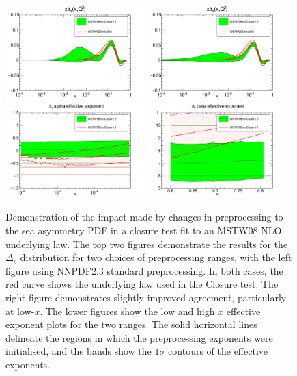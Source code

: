 \begin{figure}[hp!]
\centering
\includegraphics[width=0.48\textwidth]{7-PostLHC/figs/Preproc1/pdf_xDs_log_others.pdf}
\includegraphics[width=0.48\textwidth]{7-PostLHC/figs/Preproc2/pdf_xDs_log_others.pdf}
\includegraphics[width=0.48\textwidth]{7-PostLHC/figs/Preproc2/alphapreproc_4.pdf}
\includegraphics[width=0.48\textwidth]{7-PostLHC/figs/Preproc2/betapreproc_4.pdf}
\caption[Demonstration of the impact made by changes in preprocessing to the sea asymmetry PDF in a closure test fit]{Demonstration of the impact made by changes in preprocessing to the sea asymmetry PDF in a closure test fit to an MSTW08 NLO underlying law. The top two figures demonstrate the results for the $\Delta_s$ distribution for two choices of preprocessing ranges, with the left figure using NNPDF2.3 standard preprocessing. In both cases, the red curve shows the underlying law used in the Closure test. The right figure demonstrates slightly improved agreement, particularly at low-$x$. The lower figures show the low and high $x$ effective exponent plots for the two ranges. The solid horizontal lines delineate the regions in which the preprocessing exponents were initialised, and the bands show the $1\sigma$ contours of the effective exponents.}
\label{fig:preproc1}
\end{figure}

